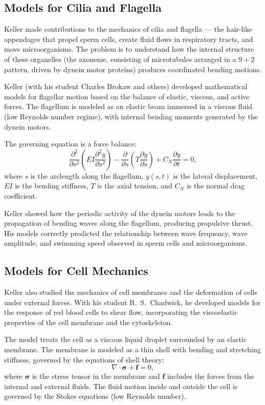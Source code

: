 \subsection{Models for Cilia and Flagella}

Keller made contributions to the mechanics of cilia and flagella --- the hair-like appendages that propel sperm cells, create fluid flows in respiratory tracts, and move microorganisms. The problem is to understand how the internal structure of these organelles (the axoneme, consisting of microtubules arranged in a \(9+2\) pattern, driven by dynein motor proteins) produces coordinated bending motions.

Keller (with his student Charles Brokaw and others) developed mathematical models for flagellar motion based on the balance of elastic, viscous, and active forces. The flagellum is modeled as an elastic beam immersed in a viscous fluid (low Reynolds number regime), with internal bending moments generated by the dynein motors.

The governing equation is a force balance:
\[
\frac{\partial^2}{\partial s^2}\left(EI\frac{\partial^2 y}{\partial s^2}\right) - \frac{\partial}{\partial s}\left(T\frac{\partial y}{\partial s}\right) + C_N \frac{\partial y}{\partial t} = 0,
\]
where \(s\) is the arclength along the flagellum, \(y(s, t)\) is the lateral displacement, \(EI\) is the bending stiffness, \(T\) is the axial tension, and \(C_N\) is the normal drag coefficient.

Keller showed how the periodic activity of the dynein motors leads to the propagation of bending waves along the flagellum, producing propulsive thrust. His models correctly predicted the relationship between wave frequency, wave amplitude, and swimming speed observed in sperm cells and microorganisms.

\subsection{Models for Cell Mechanics}

Keller also studied the mechanics of cell membranes and the deformation of cells under external forces. With his student R.\ S.\ Chadwick, he developed models for the response of red blood cells to shear flow, incorporating the viscoelastic properties of the cell membrane and the cytoskeleton.

The model treats the cell as a viscous liquid droplet surrounded by an elastic membrane. The membrane is modeled as a thin shell with bending and stretching stiffness, governed by the equations of shell theory:
\[
\nabla \cdot \boldsymbol{\sigma} + \mathbf{f} = 0,
\]
where \(\boldsymbol{\sigma}\) is the stress tensor in the membrane and \(\mathbf{f}\) includes the forces from the internal and external fluids. The fluid motion inside and outside the cell is governed by the Stokes equations (low Reynolds number).

